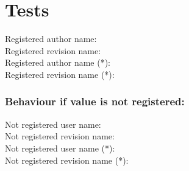 \section{Tests}

Registered author name: \svnFullAuthor{\svnfileauthor}\\
Registered revision name: \svnFullRevision{\svnfilerev}\\
Registered author name (*): \svnFullAuthor*{\svnfileauthor}\\
Registered revision name (*): \svnFullRevision*{\svnfilerev}\\

\subsubsection*{Behaviour if value is not registered:}
Not registered user name: \\
Not registered revision name: \\
Not registered user name (*): \\
Not registered revision name (*): \\



